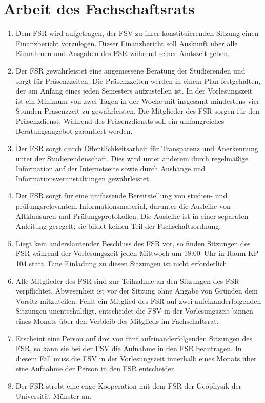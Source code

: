\section{Arbeit des Fachschaftsrats}
\begin{enumerate}
	\item Dem FSR wird aufgetragen, der FSV zu ihrer konstituierenden Sitzung einen Finanzbericht vorzulegen.
	Dieser Finanzbericht soll Auskunft über alle Einnahmen und Ausgaben des FSR während seiner Amtszeit geben.
	\item Der FSR gewährleistet eine angemessene Beratung der Studierenden und sorgt für Präsenzzeiten.
	Die Präsenzzeiten werden in einem Plan festgehalten, der am Anfang eines jeden Semesters aufzustellen ist.
	In der Vorlesungszeit ist ein Minimum von zwei Tagen in der Woche mit insgesamt mindestens vier Stunden Präsenzzeit zu gewährleisten.
	Die Mitglieder des FSR sorgen für den Präsenzdienst.
	Während des Präsenzdiensts soll ein umfangreiches Beratungsangebot garantiert werden.
	\item Der FSR sorgt durch Öffentlichkeitsarbeit für Transparenz und Anerkennung unter der Studierendenschaft.
	Dies wird unter anderem durch regelmäßige Information auf der Internetseite sowie durch Aushänge und Informationsveranstaltungen gewährleistet.
	\item Der FSR sorgt für eine umfassende Bereitstellung von studien- und prüfungsrelevantem Informationsmaterial, darunter die Ausleihe von Altklausuren und Prüfungsprotokollen.
	Die Ausleihe ist in einer separaten Anleitung geregelt; sie bildet keinen Teil der Fachschaftsordnung.
	\item Liegt kein anderslautender Beschluss des FSR vor, so finden Sitzungen des FSR während der Vorlesungszeit jeden Mittwoch um 18:00~Uhr in Raum KP 104 statt.
	Eine Einladung zu diesen Sitzungen ist nicht erforderlich.
	\item Alle Mitglieder des FSR sind zur Teilnahme an den Sitzungen des FSR verpflichtet. Abwesenheit ist vor der Sitzung ohne Angabe von Gründen dem Vorsitz mitzuteilen. Fehlt ein Mitglied des FSR auf zwei aufeinanderfolgenden Sitzungen	unentschuldigt, entscheidet die FSV in der Vorlesungszeit binnen eines Monats über den	Verbleib des Mitglieds im Fachschaftsrat.
	\item Erscheint eine Person auf drei von fünf aufeinanderfolgenden Sitzungen des FSR, so kann sie bei der FSV die Aufnahme in den FSR beantragen. In diesem Fall muss die FSV in der Vorlesungszeit innerhalb eines Monats über eine Aufnahme der	Person in den FSR entscheiden.
	\item Der FSR strebt eine enge Kooperation mit dem FSR der Geophysik der Universität Münster an.
\end{enumerate}

